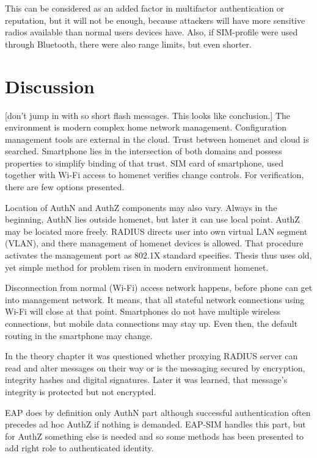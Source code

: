 \documentclass[12pt,a4paper,english]{tutthesis}
\begin{document}
This can be considered as an added factor in multifactor
authentication or reputation, but it will not be enough, because
attackers will have more sensitive  radios available than normal users
devices have. 
Also, if SIM-profile were used through Bluetooth, there were also
range limits, but even shorter.


\section{Discussion}
\label{sec-6-6}

[don't jump in with so short flash messages. This looks like conclusion.] 
The environment is modern complex home network management.
Configuration management tools are 
external in the cloud. Trust between homenet and cloud is searched.
Smartphone lies in the intersection of both domains 
and possess properties to simplify binding of that trust.
SIM card of smartphone, used together with Wi-Fi access to homenet 
verifies change controls. For verification, there are few options presented.

Location of AuthN and AuthZ components may also vary.
Always in the beginning, AuthN lies outside homenet, but
later it can use local point. AuthZ may be located more freely.
RADIUS directs user into own virtual LAN segment (VLAN),
and there management of homenet devices is allowed.
That procedure activates the management port as 802.1X standard
specifies.
Thesis thus uses old, yet simple method for problem risen in modern environment homenet.

Disconnection from normal (Wi-Fi) access network happens, before phone can get
into management network. It means, that all stateful network
connections using Wi-Fi will close at that point. Smartphones do not
have multiple wireless connections, but mobile data connections may 
stay up. Even then, the default routing in the smartphone may change.

In the theory chapter it was questioned whether proxying RADIUS server
can read and alter messages on their way or is the messaging secured
by encryption, integrity hashes and digital signatures.
Later it was learned, that message's integrity is protected but not encrypted.

EAP does by definition only AuthN part although successful
authentication often precedes ad hoc AuthZ if nothing is demanded.
EAP-SIM handles this part, but for AuthZ something else is needed
and so some methods has been presented to add right role to 
authenticated identity.
\end{document}
